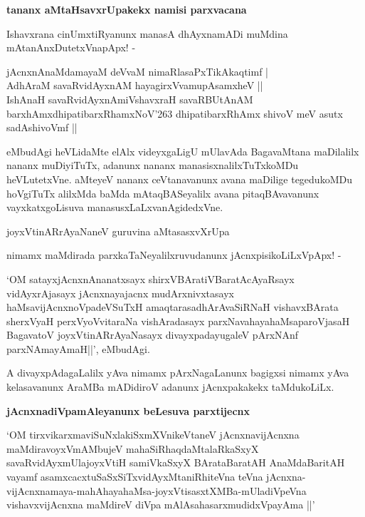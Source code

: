 {\bigskip
\noindent
{\large\bf tananx aMtaHsavxrUpakekx namisi parxvacana}}\label{page80}
\medskip

\noindent
Ishavxrana cinUmxtiRyanunx manasA dhAyxnamADi muMdina mAtanAnxDutetxVnapApx! -

\begin{shloka}
jAcnxnAnaMdamayaM deVvaM nimaRlasaPxTikAkaqtimf |\\\label{80}
AdhAraM savaRvidAyxnAM hayagirxVvamupAsamxheV ||\\

IshAnaH savaRvidAyxnAmiVshavxraH savaRBUtAnAM\\\label{80}
barxhAmxdhipatibarxRhamxNoV\char'263 dhipatibarxRhAmx shivoV meV asutx sadAshivoVmf ||
\end{shloka}

eMbudAgi heVLidaMte elAlx videyxgaLigU mUlavAda BagavaMtana maDilalilx nananx muDiyiTuTx, adanunx nananx manasisxnalilxTuTxkoMDu heVLutetxVne. aMteyeV nananx ceVtanavanunx avana maDilige tegedu\-koMDu hoVgiTuTx alilxMda baMda mAtaqBASeyalilx avana pitaqBAvavanunx vayxkatxgoLisuva manasusxLaLxva\-nAgidedxVne.

\begin{shloka}
joyxVtinARrAyaNaneV guruvina aMtasasxvXrUpa
\end{shloka}

nimamx maMdirada parxkaTaNeyalilxruvudanunx jAcnxpisikoLiLxVpApx! - 

`OM satayxjAcnxnAnanatxsayx shirxVBAratiVBaratAcAyaRsayx vidAyxrAjasayx jAcnxnayajacnx mudArxnivxtasayx haMsa\-vi\-jAcnxnoV\-padeVSuTxH amaqtarasadhArAvaSiRNaH vishavxBArata sherxVyaH perxVyoVvitaraNa vishAradasayx parxNavaha\-ya\-haMsa\-pa\-roVjasaH BagavatoV joyxVtinARrAyaNasayx divayxpadayugaleV pArxNAnf parxNAmayA\-maH||', eMbu\-dAgi.


A divayxpAdagaLalilx yAva nimamx pArxNagaLanunx bagigxsi nimamx yAva kelasavanunx AraMBa mADidiroV \-adanunx jAcnxpakakekx taMdukoLiLx.

{\bigskip
\noindent
{\large\bf jAcnxnadiVpamAleyanunx beLesuva parxtijecnx}}\label{page81}
\medskip

\noindent
`OM tirxvikarxmaviSuNxlakiSxmXVnikeVtaneV\label{81} jAcnxnavijAcnxna maMdiravoyxVmAMbujeV mahaSiR\-haqdaMtalaR\-kaSxyX savaR\-vidAyxmUlajoyxVtiH samiVkaSxyX BArataBaratAH AnaMda\-BaritAH vayamf asamxcacxtuSaSxSiTxvidAyxMtaniR\-hiteVna teVna jAcnxna-vijAcnxnamaya-mahAhayahaMsa-joyxVtisasxtXMBa-mUladiVpeVna vishavxvijAcnxna maMdireV diV\-pa mAlAsahasarxmudidxVpayAma ||'

